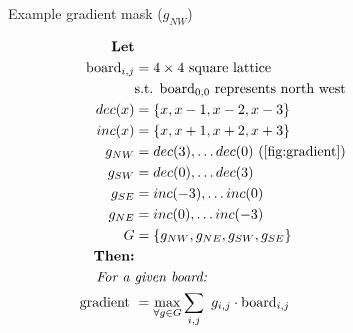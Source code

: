 \documentclass[journal]{IEEEtran}
\begin{document}
\begin{figure}[Hb]
\centering
    \caption{Example gradient mask ($g_{NW}$)}
\label{fig:gradient}
\end{figure}

\begin{framed}
\begin{align*}
    \textbf{Let} \\
    \text{\ board}_{i,j} &= 4\times{}4 \text{\ square lattice} \\
                            &\text{s.t. } \text{board}_{0,0} \text{\ represents north west} \\
    dec(x) &= \left\{x, x-1, x-2, x-3\right\} \\
    inc(x) &= \left\{x, x+1, x+2, x+3\right\} \\
    g_{NW} &= {dec(3), \dots dec(0)}~(\autoref{fig:gradient})\\
    g_{SW} &= {dec(0), \dots dec(3)} \\
    g_{SE} &= {inc(-3), \dots inc(0)} \\
    g_{NE} &= {inc(0), \dots inc(-3)} \\
    G &= \left\{g_{NW}, g_{NE}, g_{SW}, g_{SE}\right\} \\
    \textbf{Then:} \\
    \textit{For a } & \textit{given board:} \\
    \text{gradient } &= \max\limits_{\forall{}g \in G}\sum\limits_{i,j}{{\ g_{i,j} \cdot \text{board}_{i,j}}}
\end{align*}
\end{framed}
\end{document}
